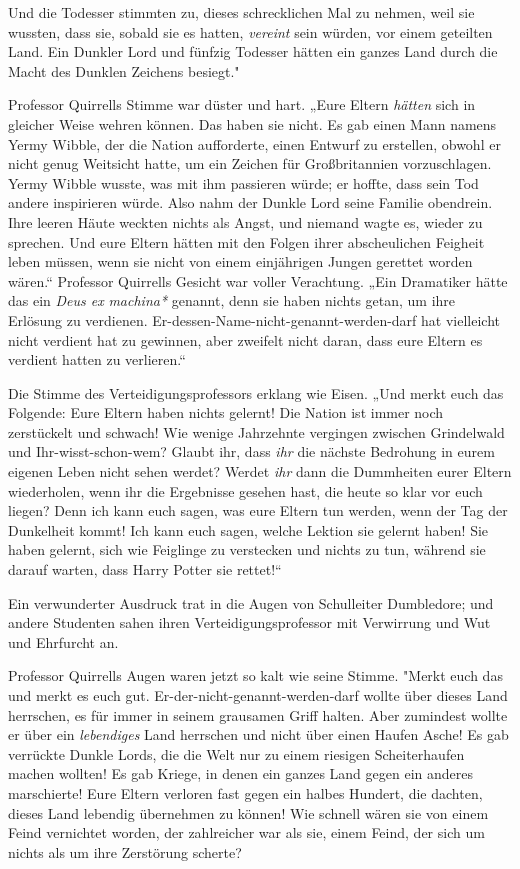 {Und die Todesser stimmten zu, dieses schrecklichen Mal zu nehmen, weil sie wussten, dass sie, sobald sie es hatten, \emph{vereint} sein würden, vor einem geteilten Land. Ein Dunkler Lord und fünfzig Todesser hätten ein ganzes Land durch die Macht des Dunklen Zeichens besiegt."

Professor Quirrells Stimme war düster und hart. „Eure Eltern \emph{hätten} sich in gleicher Weise wehren können. Das haben sie nicht. Es gab einen Mann namens Yermy Wibble, der die Nation aufforderte, einen Entwurf zu erstellen, obwohl er nicht genug Weitsicht hatte, um ein Zeichen für Großbritannien vorzuschlagen. Yermy Wibble wusste, was mit ihm passieren würde; er hoffte, dass sein Tod andere inspirieren würde. Also nahm der Dunkle Lord seine Familie obendrein. Ihre leeren Häute weckten nichts als Angst, und niemand wagte es, wieder zu sprechen. Und eure Eltern hätten mit den Folgen ihrer abscheulichen Feigheit leben müssen, wenn sie nicht von einem einjährigen Jungen gerettet worden wären.“ Professor Quirrells Gesicht war voller Verachtung. „Ein Dramatiker hätte das ein \emph{Deus ex} \emph{machina*} genannt, denn sie haben nichts getan, um ihre Erlösung zu verdienen. Er-dessen-Name-nicht-genannt-werden-darf hat vielleicht nicht verdient hat zu gewinnen, aber zweifelt nicht daran, dass eure Eltern es verdient hatten zu verlieren.“

Die Stimme des Verteidigungsprofessors erklang wie Eisen. „Und merkt euch das Folgende: Eure Eltern haben nichts gelernt! Die Nation ist immer noch zerstückelt und schwach! Wie wenige Jahrzehnte vergingen zwischen Grindelwald und Ihr-wisst-schon-wem? Glaubt ihr, dass \emph{ihr} die nächste Bedrohung in eurem eigenen Leben nicht sehen werdet? Werdet \emph{ihr} dann die Dummheiten eurer Eltern wiederholen, wenn ihr die Ergebnisse gesehen hast, die heute so klar vor euch liegen? Denn ich kann euch sagen, was eure Eltern tun werden, wenn der Tag der Dunkelheit kommt! Ich kann euch sagen, welche Lektion sie gelernt haben! Sie haben gelernt, sich wie Feiglinge zu verstecken und nichts zu tun, während sie darauf warten, dass Harry Potter sie rettet!“

Ein verwunderter Ausdruck trat in die Augen von Schulleiter Dumbledore; und andere Studenten sahen ihren Verteidigungsprofessor mit Verwirrung und Wut und Ehrfurcht an.

Professor Quirrells Augen waren jetzt so kalt wie seine Stimme. "Merkt euch das und merkt es euch gut. Er-der-nicht-genannt-werden-darf wollte über dieses Land herrschen, es für immer in seinem grausamen Griff halten. Aber zumindest wollte er über ein \emph{lebendiges} Land herrschen und nicht über einen Haufen Asche! Es gab verrückte Dunkle Lords, die die Welt nur zu einem riesigen Scheiterhaufen machen wollten! Es gab Kriege, in denen ein ganzes Land gegen ein anderes marschierte! Eure Eltern verloren fast gegen ein halbes Hundert, die dachten, dieses Land lebendig übernehmen zu können! Wie schnell wären sie von einem Feind vernichtet worden, der zahlreicher war als sie, einem Feind, der sich um nichts als um ihre Zerstörung scherte?

}
